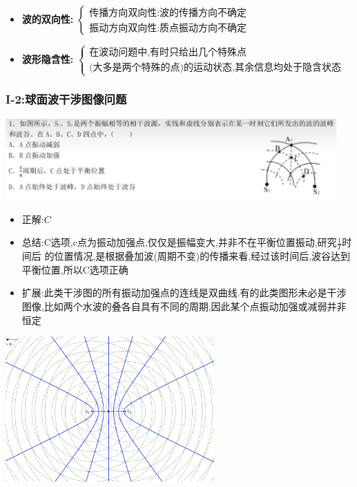 \documentclass{article}
\begin{document}
\begin{itemize}
\begin{itemize}
              \item \textbf{波的双向性:}\hspace{1em}
                    $\begin{cases}
                            \text{传播方向双向性:波的传播方向不确定} \\
                            \text{振动方向双向性:质点振动方向不确定}
                        \end{cases}$

              \item \textbf{波形隐含性:}\hspace{1em}
                    $\begin{cases}
                            \text{在波动问题中,有时只给出几个特殊点} \\
                            \text{(大多是两个特殊的点)的运动状态,其余信息均处于隐含状态}
                        \end{cases}$
          \end{itemize}

\end{itemize}

\vspace{2em}

\subsubsection{I-2:球面波干涉图像问题}
\includegraphics[width = 0.95\textwidth]{./pictures/2.1-1.png}

\begin{itemize}
    \item 正解:\quad $C$
    \item 总结:\quad C选项,c点为振动加强点,仅仅是振幅变大,并非不在平衡位置振动,研究$\frac{1}{T}$时间后
          的位置情况,是根据叠加波(周期不变)的传播来看,经过该时间后,波谷达到平衡位置,所以C选项正确
    \item 扩展:\quad 此类干涉图的所有振动加强点的连线是双曲线.有的此类图形未必是干涉图像,比如两个水波的叠各自具有不同的周期,因此某个点振动加强或减弱并非恒定
\end{itemize}

\begin{center}
    \includegraphics[width = 0.6\textwidth]{./pictures/2.1-2.png}
\end{center}
\end{document}
